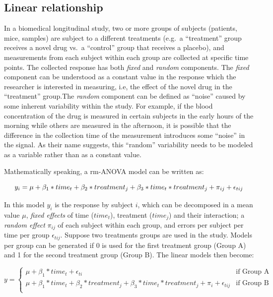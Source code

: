 \documentclass[
]{article}
\begin{document}
\hypertarget{linear-relationship}{%
\subsection{Linear relationship}\label{linear-relationship}}

In a biomedical longitudinal study, two or more groups of subjects (patients, mice, samples) are subject to a different treatments (e.g.~a ``treatment'' group receives a novel drug vs.~a ``control'' group that receives a placebo), and measurements from each subject within each group are collected at specific time points. The collected response has both \emph{fixed} and \emph{random} components. The \emph{fixed} component can be understood as a constant value in the response which the researcher is interested in measuring, i.e, the effect of the novel drug in the ``treatment'' group.The \emph{random} component can be defined as ``noise'' caused by some inherent variability within the study. For example, if the blood concentration of the drug is measured in certain subjects in the early hours of the morning while others are measured in the afternoon, it is possible that the difference in the collection time of the measurement introduces some ``noise'' in the signal. As their name suggests, this ``random'' variability needs to be modeled as a variable rather than as a constant value.

Mathematically speaking, a rm-ANOVA model can be written as:

\begin{equation}
  y_{i} = \mu+ \beta_1* time_{t} + \beta_2* treatment_{j} + \beta_3* time_{t} *                                    treatment_{j}+\pi_{ij} +\epsilon_{tij}\\ 
  \label{eq:linear-model}
\end{equation}

In this model \(y_i\) is the response by subject \(i\), which can be decomposed in a mean value \(\mu\), \emph{fixed effects} of time (\(time_t\)), treatment (\(time_j\)) and their interaction; a \emph{random effect} \(\pi_{ij}\) of each subject within each group, and errors per subject per time per group \(\epsilon_{tij}\).
Suppose two treatments groups are used in the study. Models per group can be generated if 0 is used for the first treatment group (Group A) and 1 for the second treatment group (Group B). The linear models then become:

\begin{equation}
  y = \begin{cases}
  \mu + \beta_1*time_{t}+\epsilon_{ti}   & \mbox{if Group A}\\
  \mu + \beta_1 * time_{t} + \beta_2 * treatment_{j} +\beta_3* time_{t} * treatment_{j}+\pi_{i}+\epsilon_{tij}  & \mbox{if Group B}\\
  \end{cases}
  \label{eq:ANOVA-by-group}
\end{equation}
\end{document}
